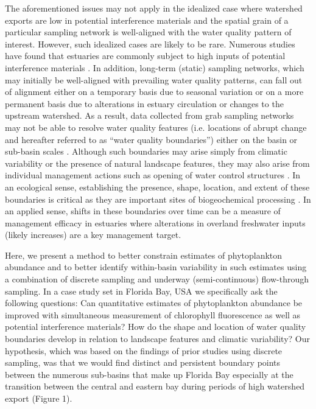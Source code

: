 \documentclass[review]{elsarticle}
\begin{document}
The aforementioned issues may not apply in the idealized case where watershed exports are low in potential interference materials and the spatial grain of a particular sampling network is well-aligned with the water quality pattern of interest. However, such idealized cases are likely to be rare. Numerous studies have found that estuaries are commonly subject to high inputs of potential interference materials \citep[e.g. color dissolved organic matter;][]{du2010characteristics}. In addition, long-term (static) sampling networks, which may initially be well-aligned with prevailing water quality patterns, can fall out of alignment either on a temporary basis due to seasonal variation or on a more permanent basis due to alterations in estuary circulation or changes to the upstream watershed. As a result, data collected from grab sampling networks may not be able to resolve water quality features (i.e. locations of abrupt change and hereafter referred to as “water quality boundaries”) either on the basin or sub-basin scales \citep{anttila2008feasible, largier1993estuarine}. Although such boundaries may arise simply from climatic variability or the presence of natural landscape features, they may also arise from individual management actions such as opening of water control structures \citep{lane_effects_2007}. In an ecological sense, establishing the presence, shape, location, and extent of these boundaries is critical as they are important sites of biogeochemical processing \citep{largier1993estuarine}. In an applied sense, shifts in these boundaries over time can be a measure of management efficacy in estuaries where alterations in overland freshwater inputs (likely increases) are a key management target.

Here, we present a method to better constrain estimates of phytoplankton abundance and to better identify within-basin variability in such estimates using a combination of discrete sampling and underway (semi-continuous) flow-through sampling. In a case study set in Florida Bay, USA we specifically ask the following questions: Can quantitative estimates of phytoplankton abundance be improved with simultaneous measurement of chlorophyll fluorescence as well as potential interference materials? How do the shape and location of water quality boundaries develop in relation to landscape features and climatic variability? Our hypothesis, which was based on the findings of prior studies using discrete sampling, was that we would find distinct and persistent boundary points between the numerous sub-basins that make up Florida Bay especially at the transition between the central and eastern bay during periods of high watershed export (Figure 1).
  
\end{document}
